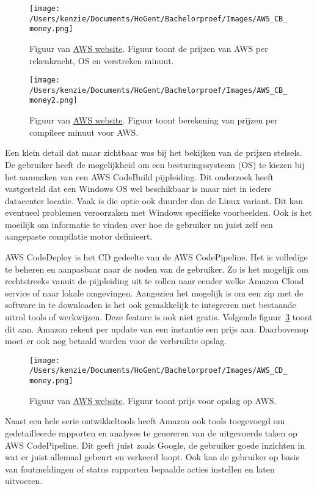 \begin{figure}[!htbp]
    \centering
    \texttt{[image: /Users/kenzie/Documents/HoGent/Bachelorproef/Images/AWS\_CB\_money.png]}
    \caption{Figuur van \href{}{AWS website}. Figuur toont de prijzen van AWS per rekenkracht, OS en verstreken minuut.}
    \label{fig:AWS_CB_money}
\end{figure}
\begin{figure}[!htbp]
    \centering
    \texttt{[image: /Users/kenzie/Documents/HoGent/Bachelorproef/Images/AWS\_CB\_money2.png]}
    \caption{Figuur van \href{}{AWS website}. Figuur toont berekening van prijzen per compileer minuut voor AWS.}
    \label{fig:AWS_CB_money2}
\end{figure}

Een klein detail dat maar zichtbaar was bij het bekijken van de prijzen stelsels. De gebruiker heeft de mogelijkheid om een besturingssysteem (OS) te kiezen bij het aanmaken van een AWS CodeBuild pijpleiding. Dit onderzoek heeft vastgesteld dat een Windows OS wel beschikbaar is maar niet in iedere datacenter locatie. Vaak is die optie ook duurder dan de Linux variant. Dit kan eventueel problemen veroorzaken met Windows specifieke voorbeelden. Ook is het moeilijk om informatie te vinden over hoe de gebruiker nu juist zelf een aangepaste compilatie motor definieert. 

AWS CodeDeploy is het CD gedeelte van de AWS CodePipeline. Het is volledige te beheren en aanpasbaar naar de noden van de gebruiker. Zo is het mogelijk om rechtstreeks vanuit de pijpleiding uit te rollen naar eender welke Amazon Cloud service of naar lokale omgevingen. Aangezien het mogelijk is om een zip met de software in te downloaden is het ook gemakkelijk te integreren met bestaande uitrol tools of werkwijzen. Deze feature is ook niet gratis. Volgende figuur~\ref{fig:AWS_CD_money} toont dit aan. Amazon rekent per update van een instantie een prijs aan. Daarbovenop moet er ook nog betaald worden voor de verbruikte opslag.

\begin{figure}[!htbp]
    \centering
    \texttt{[image: /Users/kenzie/Documents/HoGent/Bachelorproef/Images/AWS\_CD\_money.png]}
    \caption{Figuur van \href{}{AWS website}. Figuur toont prijs voor opslag op AWS.}
    \label{fig:AWS_CD_money}
\end{figure}

Naast een hele serie ontwikkeltools heeft Amazon ook tools toegevoegd om gedetailleerde rapporten en analyses te genereren van de uitgevoerde taken op AWS CodePipeline. Dit geeft juist zoals Google, de gebruiker goede inzichten in wat er juist allemaal gebeurt en verkeerd loopt. Ook kan de gebruiker op basis van foutmeldingen of status rapporten bepaalde acties instellen en laten uitvoeren.

